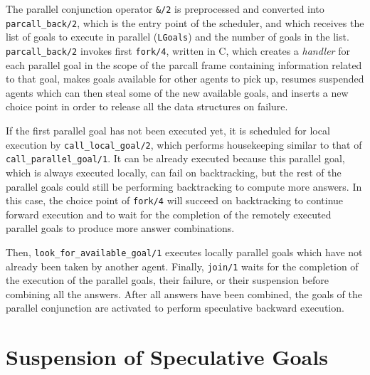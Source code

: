 \documentclass{tlp}
\newcounter{mnotei} \setcounter{mnotei}{0}
\newcommand{\mnote}[1]{{\scriptsize\textsf{\textcolor{blue}{$^{[\themnotei]}$}}}\marginpar{\scriptsize\textsf{\textcolor{red}{n.\themnotei: #1}}}\stepcounter{mnotei} }
\renewcommand{\mnote}[1]{}
\newcommand{\compressection}{\vspace{-1em}}
\begin{document}
The parallel conjunction operator \lstinline{&/2} is
preprocessed and converted into \lstinline{parcall_back/2}, which is
the entry point of the scheduler, and which receives the list of goals
to execute in parallel (\lstinline{LGoals}) and the number of goals in
the list.
\lstinline{parcall_back/2} invokes first \lstinline{fork/4}, written
in C, which creates a \emph{handler} for each parallel goal in the
scope of the parcall frame containing information related to that
goal, makes goals available for other agents to pick up, resumes
suspended agents which can then steal some of the new 
available goals, and inserts a new choice point in order to release all
the data structures on failure.

If the first parallel goal has not been executed yet, it is scheduled
for local execution\mnote{MCL: in many cases (e.g., usual recursion)
  it is much better to execute the last (or, in general, the recursive
  one) in order to spawn parallel goals as fast as possible.} by
\lstinline{call_local_goal/2}, which performs housekeeping similar to
that of \lstinline{call_parallel_goal/1}.  It can be already executed
because\mnote{MCL: I don't understand this?} this parallel goal, which
is always executed locally, can fail on backtracking, but the rest of
the parallel goals could still be performing backtracking to compute
more answers.  In this case, the choice point of \lstinline{fork/4}
will succeed on backtracking to continue forward execution and to wait
for the completion of the remotely executed parallel goals to produce
more answer combinations.


Then, \lstinline{look_for_available_goal/1} executes locally parallel
goals which have not already been taken by another agent.  Finally,
\lstinline{join/1} waits for the completion of the execution of the
parallel goals, their failure, or their suspension before combining
all the answers. After all answers have been combined, the goals of the
parallel conjunction are activated to perform speculative backward
execution.


\compressection
\section{Suspension of Speculative Goals}
\label{sec:goal-suspension}
\end{document}
